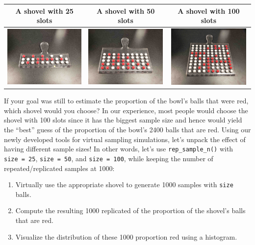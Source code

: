 \documentclass[12pt, krantz2,]{krantz}
\providecommand{\tightlist}{%
  \setlength{\itemsep}{0pt}\setlength{\parskip}{0pt}}
\begin{document}
\begin{longtable}[]{@{}ccc@{}}
\toprule
A shovel with 25 slots & A shovel with 50 slots & A shovel with 100 slots\tabularnewline
\midrule
\endhead
\includegraphics[width=1.6in,height=\textheight]{images/sampling/balls/shovel_025.jpg} & \includegraphics[width=1.6in,height=\textheight]{images/sampling/balls/shovel_050.jpg} & \includegraphics[width=1.6in,height=\textheight]{images/sampling/balls/shovel_100.jpg}\tabularnewline
\bottomrule
\end{longtable}

If your goal was still to estimate the proportion of the bowl's balls that were red, which shovel would you choose? In our experience, most people would choose the shovel with 100 slots since it has the biggest sample size and hence would yield the ``best'' guess of the proportion of the bowl's 2400 balls that are red. Using our newly developed tools for virtual sampling simulations, let's unpack the effect of having different sample sizes! In other words, let's use \texttt{rep\_sample\_n()} with \texttt{size\ =\ 25}, \texttt{size\ =\ 50}, and \texttt{size\ =\ 100}, while keeping the number of repeated/replicated samples at 1000:

\begin{enumerate}
\def\labelenumi{\arabic{enumi}.}
\tightlist
\item
  Virtually use the appropriate shovel to generate 1000 samples with \texttt{size} balls.
\item
  Compute the resulting 1000 replicated of the proportion of the shovel's balls that are red.
\item
  Visualize the distribution of these 1000 proportion red using a histogram.
\end{enumerate}
\end{document}
